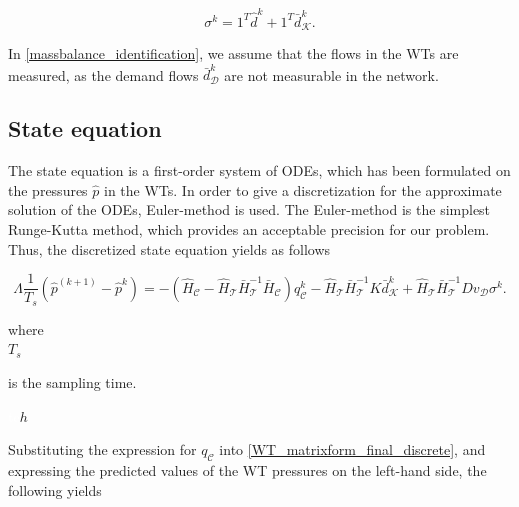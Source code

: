 \begin{equation}
\label{massbalance_identification}
 \sigma^{k} = 1^T \hat{d}^{k} + 1^T \bar{d}^{k}_{\mathcal{K}}.
\end{equation}

 In \eqref{massbalance_identification}, we assume that the flows in the WTs are measured, as the demand flows $\bar{d}^{k}_{\mathcal{D}} $ are not measurable in the network. 

 \subsection{State equation}
\label{state_eq_identification} 

The state equation is a first-order system of ODEs, which has been formulated on the pressures $\hat{p}$ in the WTs. In order to give a discretization for the approximate solution of the ODEs, Euler-method is used. The Euler-method is the simplest Runge-Kutta method, which provides an acceptable precision for our problem\cite{chicone2006ordinary}. Thus, the discretized state equation yields as follows

\begin{equation}
  \label{WT_matrixform_final_discrete}
\Lambda \frac{1}{T_s} (\hat{p}^{(k+1)} - \hat{p}^{k})  = - (\hat{H}_{\mathcal{C}} - \hat{H}_{\mathcal{T}} \bar{H}^{-1}_{\mathcal{T}}\bar{H}_{\mathcal{C}})  q^{k}_{\mathcal{C}} - \hat{H}_{\mathcal{T}} \bar{H}^{-1}_{\mathcal{T}} K \bar{d}^{k}_{\mathcal{K}} + \hat{H}_{\mathcal{T}} \bar{H}^{-1}_{\mathcal{T}} D v_{\mathcal{D}} \sigma^{k}.
\end{equation}

\begin{minipage}[t]{0.20\textwidth}
where\\
\hspace*{8mm} $T_s$
\end{minipage}
\begin{minipage}[t]{0.68\textwidth}
\vspace*{2mm}
 is the sampling time.
\end{minipage}
\begin{minipage}[t]{0.10\textwidth}
\vspace*{2mm}
\textcolor{White}{te}$\unit{h}$
\end{minipage} 

Substituting the expression for $q_{\mathcal{C}}$ into \eqref{WT_matrixform_final_discrete}, and expressing the predicted values of the WT pressures on the left-hand side, the following yields

